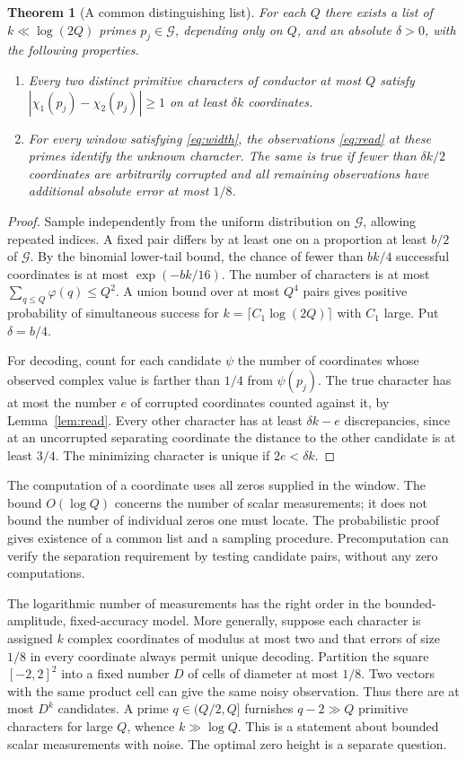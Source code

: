 \documentclass[11pt]{article}
\newtheorem{theorem}{Theorem}[section]
\newcommand{\GG}{\mathcal G}
\begin{document}
\begin{theorem}[A common distinguishing list]\label{th:compression}
For each $Q$ there exists a list of $k\ll\log(2Q)$ primes $p_j\in\GG$, depending only on $Q$, and an absolute $\delta>0$, with the following properties.
\begin{enumerate}[label=(\roman*),leftmargin=2.1em]
\item Every two distinct primitive characters of conductor at most $Q$ satisfy $|\chi_1(p_j)-\chi_2(p_j)|\ge1$ on at least $\delta k$ coordinates.
\item For every window satisfying \eqref{eq:width}, the observations \eqref{eq:read} at these primes identify the unknown character. The same is true if fewer than $\delta k/2$ coordinates are arbitrarily corrupted and all remaining observations have additional absolute error at most $1/8$.
\end{enumerate}
\end{theorem}
\begin{proof}
Sample independently from the uniform distribution on $\GG$, allowing repeated indices. A fixed pair differs by at least one on a proportion at least $b/2$ of $\GG$. By the binomial lower-tail bound, the chance of fewer than $bk/4$ successful coordinates is at most $\exp(-bk/16)$. The number of characters is at most $\sum_{q\le Q}\varphi(q)\le Q^2$. A union bound over at most $Q^4$ pairs gives positive probability of simultaneous success for $k=\lceil C_1\log(2Q)\rceil$ with $C_1$ large. Put $\delta=b/4$.

For decoding, count for each candidate $\psi$ the number of coordinates whose observed complex value is farther than $1/4$ from $\psi(p_j)$. The true character has at most the number $e$ of corrupted coordinates counted against it, by Lemma~\ref{lem:read}. Every other character has at least $\delta k-e$ discrepancies, since at an uncorrupted separating coordinate the distance to the other candidate is at least $3/4$. The minimizing character is unique if $2e<\delta k$.
\end{proof}
The computation of a coordinate uses all zeros supplied in the window. The bound $O(\log Q)$ concerns the number of scalar measurements; it does not bound the number of individual zeros one must locate. The probabilistic proof gives existence of a common list and a sampling procedure. Precomputation can verify the separation requirement by testing candidate pairs, without any zero computations.

The logarithmic number of measurements has the right order in the bounded-amplitude, fixed-accuracy model. More generally, suppose each character is assigned $k$ complex coordinates of modulus at most two and that errors of size $1/8$ in every coordinate always permit unique decoding. Partition the square $[-2,2]^2$ into a fixed number $D$ of cells of diameter at most $1/8$. Two vectors with the same product cell can give the same noisy observation. Thus there are at most $D^k$ candidates. A prime $q\in(Q/2,Q]$ furnishes $q-2\gg Q$ primitive characters for large $Q$, whence $k\gg\log Q$. This is a statement about bounded scalar measurements with noise. The optimal zero height is a separate question.
\end{document}
